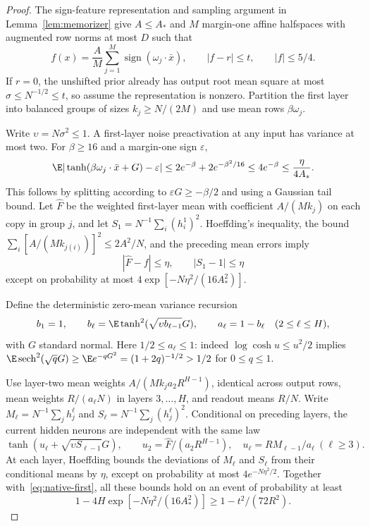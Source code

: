 \begin{proof}
The sign-feature representation and sampling argument in Lemma~\ref{lem:memorizer} give $A\le A_*$ and $M$ margin-one affine halfspaces with augmented row norms at most $D$ such that
\[
 f(x)=\frac A M\sum_{j=1}^M\operatorname{sign}(\omega_j\cdot\bar x),
 \qquad |f-r|\le t,\qquad |f|\le5/4.
\]
If $r=0$, the unshifted prior already has output root mean square at most $\sigma\le N^{-1/2}\le t$, so assume the representation is nonzero. Partition the first layer into balanced groups of sizes $k_j\ge N/(2M)$ and use mean rows $\beta\omega_j$.

Write $\upsilon=N\sigma^2\le1$. A first-layer noise preactivation at any input has variance at most two. For $\beta\ge16$ and a margin-one sign $\varepsilon$,
\[
 \E|\tanh(\beta\omega_j\cdot\bar x+G)-\varepsilon|
 \le2e^{-\beta}+2e^{-\beta^2/16}\le4e^{-\beta}
 \le\frac{\eta}{4A_*}.
\]
This follows by splitting according to $\varepsilon G\ge-\beta/2$ and using a Gaussian tail bound. Let $\widehat F$ be the weighted first-layer mean with coefficient $A/(Mk_j)$ on each copy in group $j$, and let $S_1=N^{-1}\sum_i(h_i^1)^2$. Hoeffding's inequality, the bound $\sum_i[A/(Mk_{j(i)})]^2\le2A^2/N$, and the preceding mean errors imply
\begin{equation}
 |\widehat F-f|\le\eta,\qquad |S_1-1|\le\eta
 \label{eq:native-first}
\end{equation}
except on probability at most $4\exp[-N\eta^2/(16A_*^2)]$.

Define the deterministic zero-mean variance recursion
\[
 b_1=1,\qquad
 b_\ell=\E\tanh^2(\sqrt{\upsilon b_{\ell-1}}G),\qquad
 a_\ell=1-b_\ell\quad(2\le\ell\le H),
\]
with $G$ standard normal. Here $1/2\le a_\ell\le1$: indeed
$\log\cosh u\le u^2/2$ implies
$\E\operatorname{sech}^2(\sqrt qG)\ge\E e^{-qG^2}=(1+2q)^{-1/2}>1/2$ for $0\le q\le1$.

Use layer-two mean weights $A/(Mk_j a_2R^{H-1})$, identical across output rows, mean weights $R/(a_\ell N)$ in layers $3,\ldots,H$, and readout means $R/N$. Write $M_\ell=N^{-1}\sum_jh_j^\ell$ and $S_\ell=N^{-1}\sum_j(h_j^\ell)^2$. Conditional on preceding layers, the current hidden neurons are independent with the same law
\[
 \tanh(u_\ell+\sqrt{\upsilon S_{\ell-1}}G),\qquad
 u_2=\widehat F/(a_2R^{H-1}),\quad
 u_\ell=RM_{\ell-1}/a_\ell\ (\ell\ge3).
\]
At each layer, Hoeffding bounds the deviations of $M_\ell$ and $S_\ell$ from their conditional means by $\eta$, except on probability at most $4e^{-N\eta^2/2}$. Together with~\eqref{eq:native-first}, all these bounds hold on an event of probability at least
\begin{equation}
 1-4H\exp[-N\eta^2/(16A_*^2)]
 \ge1-t^2/(72R^2).
 \label{eq:native-good}
\end{equation}


\end{proof}
